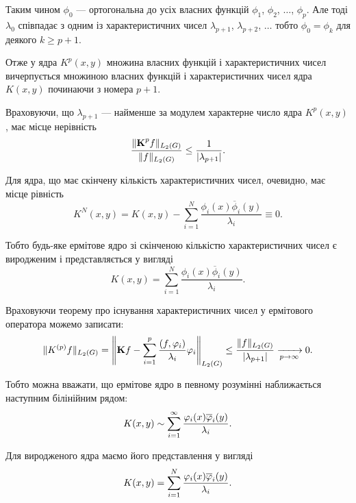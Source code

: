 Таким чином $\phi_0$ --- ортогональна до усіх власних функцій $\phi_1$, $\phi_2$, $\ldots$, $\phi_p$. Але тоді $\lambda_0$ співпадає з одним із характеристичних чисел $\lambda_{p + 1}$, $\lambda_{p + 2}$, $\ldots$ тобто $\phi_0 = \phi_k$ для деякого $k \ge p + 1$. \medskip

Отже у ядра $K^p(x, y)$ множина власних функцій і характеристичних чисел вичерпується множиною власних функцій і характеристичних чисел ядра $K(x, y)$ починаючи з номера $p + 1$. \medskip

Враховуючи, що $\lambda_{p + 1}$ --- найменше за модулем характерне число ядра $K^p(x, y)$, має місце нерівність
\begin{equation}
	\dfrac{\|\bf{K}^p f\|_{L_2(G)}}{\|f\|_{L_2(G)}} \le \dfrac{1}{|\lambda_{p + 1}|}.
\end{equation}

Для ядра, що має скінчену кількість характеристичних чисел, очевидно, має місце рівність
\begin{equation}
	K^N(x, y) = K(x, y) - \sum_{i = 1}^N \frac{\phi_i(x) \overline \phi_i(y)}{\lambda_i} \equiv 0.
\end{equation}

Тобто будь-яке ермітове ядро зі скінченою кількістю характеристичних чисел є виродженим і представляється у вигляді
\begin{equation}
	K(x, y) = \sum_{i = 1}^N \frac{\phi_i(x) \overline \phi_i(y)}{\lambda_i}.
\end{equation}

Враховуючи теорему про існування характеристичних чисел у ермітового оператора можемо записати:
\begin{equation}
	\| K^{(p)} f \|_{L_2(G)} = \left\| \bf{K}f - \Sum_{i = 1}^p \dfrac{(f, \phi_i)}{\lambda_i} \phi_i \right\|_{L_2(G)} \le \dfrac{\|f\|_{L_2(G)}}{|\lambda_{p + 1}|} \xrightarrow[p\to\infty]{} 0.
\end{equation}

Тобто можна вважати, що ермітове ядро в певному розумінні наближається наступним білінійним рядом:
\begin{equation}
	K(x, y) \sim \Sum_{i = 1}^\infty \dfrac{\phi_i(x) \overline \phi_i(y)}{\lambda_i}.
\end{equation}

Для виродженого ядра маємо його представлення у вигляді
\begin{equation}
	K(x, y) = \Sum_{i = 1}^N \dfrac{\phi_i(x) \overline \phi_i(y)}{\lambda_i}.
\end{equation}

